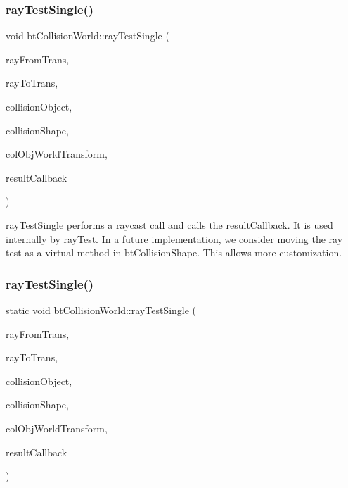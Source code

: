 \subsubsection{\texorpdfstring{ray\+Test\+Single()}{rayTestSingle()}\hspace{0.1cm}{\footnotesize\ttfamily [1/2]}}
{\footnotesize\ttfamily void bt\+Collision\+World\+::ray\+Test\+Single (\begin{DoxyParamCaption}\item[{const bt\+Transform \&}]{ray\+From\+Trans,  }\item[{const bt\+Transform \&}]{ray\+To\+Trans,  }\item[{bt\+Collision\+Object $\ast$}]{collision\+Object,  }\item[{const bt\+Collision\+Shape $\ast$}]{collision\+Shape,  }\item[{const bt\+Transform \&}]{col\+Obj\+World\+Transform,  }\item[{\hyperlink{structbtCollisionWorld_1_1RayResultCallback}{Ray\+Result\+Callback} \&}]{result\+Callback }\end{DoxyParamCaption})\hspace{0.3cm}{\ttfamily [static]}}

ray\+Test\+Single performs a raycast call and calls the result\+Callback. It is used internally by ray\+Test. In a future implementation, we consider moving the ray test as a virtual method in bt\+Collision\+Shape. This allows more customization. \mbox{\label{classbtCollisionWorld_a2c4ba56a014d2a7d97d9da557f359f36}} 
\subsubsection{\texorpdfstring{ray\+Test\+Single()}{rayTestSingle()}\hspace{0.1cm}{\footnotesize\ttfamily [2/2]}}
{\footnotesize\ttfamily static void bt\+Collision\+World\+::ray\+Test\+Single (\begin{DoxyParamCaption}\item[{const bt\+Transform \&}]{ray\+From\+Trans,  }\item[{const bt\+Transform \&}]{ray\+To\+Trans,  }\item[{bt\+Collision\+Object $\ast$}]{collision\+Object,  }\item[{const bt\+Collision\+Shape $\ast$}]{collision\+Shape,  }\item[{const bt\+Transform \&}]{col\+Obj\+World\+Transform,  }\item[{\hyperlink{structbtCollisionWorld_1_1RayResultCallback}{Ray\+Result\+Callback} \&}]{result\+Callback }\end{DoxyParamCaption})\hspace{0.3cm}{\ttfamily [static]}}

